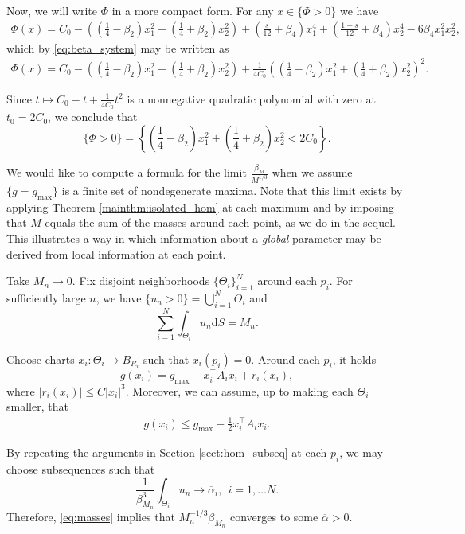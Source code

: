 \documentclass[10pt,a4paper]{article}
\newcommand{\gmax}{g_{\mathrm{max}}}
\numberwithin{equation}{section}
\begin{document}
Now, we will write $\Phi$ in a more compact form. For any $x\in \{\Phi>0\}$ we have
\begin{align*}
	\Phi(x) = C_0 - \left( \left( \frac{1}{4} - \beta_2 \right)x_1^{2} + \left( \frac{1}{4} + \beta_2 \right) x_2^{2} \right) + \left( \frac{s}{12} + \beta_4 \right)x_1^{4}  + \left( \frac{1-s}{12} + \beta_4 \right)x_2^{4} - 6\beta_4 x_1^{2}x_2^{2}, 
\end{align*}
which by \eqref{eq:beta_system} may be written as
\begin{align*}
	\Phi(x) = C_0 - \left( \left( \frac{1}{4} - \beta_2 \right)x_1^{2} + \left( \frac{1}{4} + \beta_2 \right) x_2^{2} \right) + \frac{1}{4C_0}\left( \left( \frac{1}{4} - \beta_2 \right)x_1^{2} + \left( \frac{1}{4} + \beta_2 \right) x_2^{2} \right)^{2}.
\end{align*}

Since $t\mapsto C_0 - t + \frac{1}{4C_0}t^{2}$ is a nonnegative quadratic polynomial with zero at $t_0 = 2C_0$, we conclude that
\[
	\{\Phi>0\} = \left\{ \left( \frac{1}{4} - \beta_2 \right)x_1^{2} + \left( \frac{1}{4} + \beta_2 \right) x_2^{2} < 2C_0\right\}.
\]

	We would like to compute a formula for the limit $ \frac{\beta_M}{M^{1/3}} $ when we assume $ \{g = \gmax \} $ is a finite set of nondegenerate maxima. Note that this limit exists by applying Theorem \ref{mainthm:isolated_hom} at each maximum and by imposing that $ M $ equals the sum of the masses around each point, as we do in the sequel. This illustrates a way in which information about a \textit{global} parameter may be derived from local information at each point.

	Take $ M_n \rightarrow 0 $. Fix disjoint neighborhoods $ \{\Theta_i\}_{i=1}^N $ around each $ p_i $. For sufficiently large $ n $, we have $ \{u_n > 0 \} = \bigcup_{i=1}^N \Theta_i $ and
\begin{equation}
	\label{eq:masses}
	\sum_{i=1}^{N} \int_{\Theta_i} u_n \mathrm{d}S = M_n.
\end{equation}

Choose charts $x_i: \Theta_i \rightarrow B_{R_i}$ such that $x_i(p_i) = 0$. Around each $p_i$, it holds 
\[
g(x_i) = \gmax - x_i^{\top}A_i x_i + r_i(x_i),
\]
where $|r_i(x_i)| \leq C|x_i|^{3}$. Moreover, we can assume, up to making each $\Theta_i$ smaller, that
\begin{align*}
	g(x_i) \leq \gmax - \frac{1}{2}x_i^{\top}A_i x_i.
\end{align*}

By repeating the arguments in Section \ref{sect:hom_subseq} at each $ p_i $, we may choose subsequences such that 
\[
	\frac{1}{\beta_{M_n}^{3}}\int_{\Theta_i} u_{n} \rightarrow \overline{\alpha}_i ,~~ i=1,\hdots N.
\]
Therefore, \eqref{eq:masses} implies that $M_n^{-1/3} \beta_{M_n}$ converges to some $ \overline{\alpha} >0 $.
\end{document}
